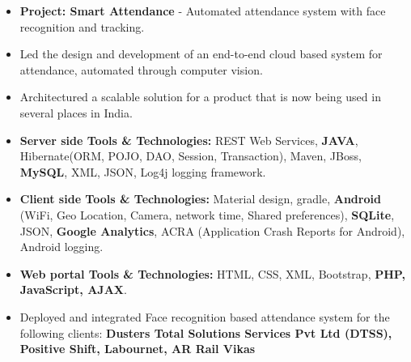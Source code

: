 \documentclass[10pt,a4paper,ragged2e,withhyper]{altacv}
\begin{document}
\begin{paracol}{2}
\begin{itemize}
\item \textbf{Project: Smart Attendance} - Automated attendance system with face recognition and tracking.
\item Led the design and development of an end-to-end cloud based system for attendance, automated through computer vision.
\item Architectured a scalable solution for a product that is now being used in several places in India.
\item \textbf{Server side Tools \& Technologies:} REST Web Services, \textbf{JAVA}, Hibernate(ORM, POJO, DAO, Session, Transaction), Maven, JBoss, \textbf{MySQL}, XML, JSON, Log4j logging framework.
\item \textbf{Client side Tools \& Technologies:} Material design, gradle, \textbf{Android} (WiFi, Geo Location, Camera, network time, Shared preferences), \textbf{SQLite}, JSON, \textbf{Google Analytics}, ACRA (Application Crash Reports for Android), Android logging.
\item \textbf{Web portal Tools \& Technologies:} HTML, CSS, XML, Bootstrap, \textbf{PHP, JavaScript, AJAX}.
\item Deployed and integrated Face recognition based attendance system for the following clients: \textbf{Dusters Total Solutions Services Pvt Ltd (DTSS), Positive Shift, Labournet, AR Rail Vikas}

\end{itemize}



\end{paracol}
\end{document}
